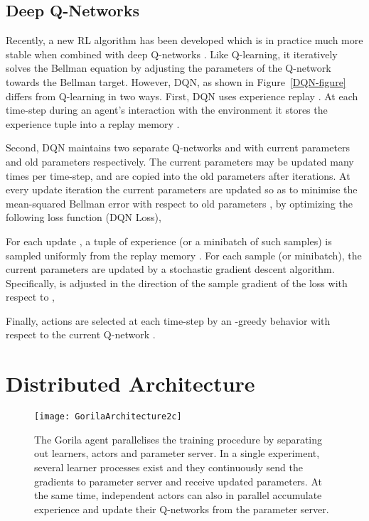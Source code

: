 \documentclass{article}
\begin{document}
\subsection{Deep Q-Networks}
Recently, a new RL algorithm has been developed which is in practice much more stable when combined with deep Q-networks \cite{mnih2013atari,mnih-dqn-2015}. Like Q-learning, it iteratively solves the Bellman equation by adjusting the parameters of the Q-network towards the Bellman target. However, DQN, as shown in Figure~\ref{DQN-figure} differs from Q-learning in two ways. First, DQN uses experience replay \cite{lin1993reinforcement}. At each time-step  during an agent's interaction with the environment it stores the experience tuple  into a replay memory . 

Second, DQN maintains two separate Q-networks  and  with current parameters  and old parameters  respectively. The current parameters  may be updated many times per time-step, and are copied into the old parameters  after  iterations. At every update iteration  the current parameters  are updated so as to minimise the mean-squared Bellman error with respect to old parameters , by optimizing the following loss function (DQN Loss),
\begin{small}

\end{small}
For each update , a tuple of experience  (or a minibatch of such samples) is sampled uniformly from the replay memory . For each sample (or minibatch), the current parameters  are updated by a stochastic gradient descent algorithm. Specifically,  is adjusted in the direction of the sample gradient  of the loss with respect to ,
\begin{small}

\end{small}
Finally, actions are selected at each time-step  by an -greedy behavior with respect to the current Q-network .
 \section{Distributed Architecture}

\begin{figure*}[ht]
\begin{center}
		\centerline{\texttt{[image: GorilaArchitecture2c]}}
		\caption{The Gorila agent parallelises the training procedure by separating out learners, actors and parameter server. In a single experiment, several learner processes exist and they continuously send the gradients to parameter server and receive updated parameters. At the same time, independent actors can also in parallel accumulate experience and update their Q-networks from the parameter server. }
		\label{Gorila-figure}
	\end{center}
	\vskip -0.2in
\end{figure*}
\end{document}
